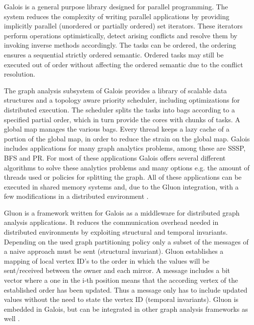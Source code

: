 Galois \cite{origGalois} is a general purpose library designed for parallel programming. 
The system reduces the complexity of writing parallel applications by providing implicitly parallel (unordered or partially ordered) set iterators. 
These iterators perform operations optimistically, detect arising conflicts and resolve them by invoking inverse methods accordingly. 
The tasks can be ordered, the ordering ensures a sequential strictly ordered semantic. 
Ordered tasks may still be executed out of order without affecting the ordered semantic due to the conflict resolution.

The graph analysis subsystem of Galois \cite{Galois} provides a library of scalable data structures and a topology aware priority scheduler, including optimizations for distributed execution. 
The scheduler splits the tasks into bags according to a specified partial order, which in turn provide the cores with chunks of tasks. 
A global map manages the various bags. 
Every thread keeps a lazy cache of a portion of the global map, in order to reduce the strain on the global map. 
Galois includes applications for many graph analytics problems, among these are SSSP, BFS and PR. 
For most of these applications Galois offers several different algorithms to solve these analytics problems and many options e.g. the amount of threads used or policies for splitting the graph. 
All of these applications can be executed in shared memory systems and, due to the Gluon integration, with a few modifications in a distributed environment \cite{vertGalois}.

Gluon \cite{vertGalois} is a framework written for Galois as a middleware for distributed graph analysis applications. 
It reduces the communication overhead needed in distributed environments by exploiting structural and temporal invariants. 
Depending on the used graph partitioning policy only a subset of the messages of a naive approach must be sent (structural invariant). 
Gluon establishes a mapping of local vertex ID's to the order in which the values will be sent/received between the owner and each mirror. 
A message includes a bit vector where a one in the i-th position means that the according vertex of the established order has been updated. 
Thus a message only has to include updated values without the need to state the vertex ID (temporal invariants). 
Gluon is embedded in Galois, but can be integrated in other graph analysis frameworks as well \cite{vertGalois}.
